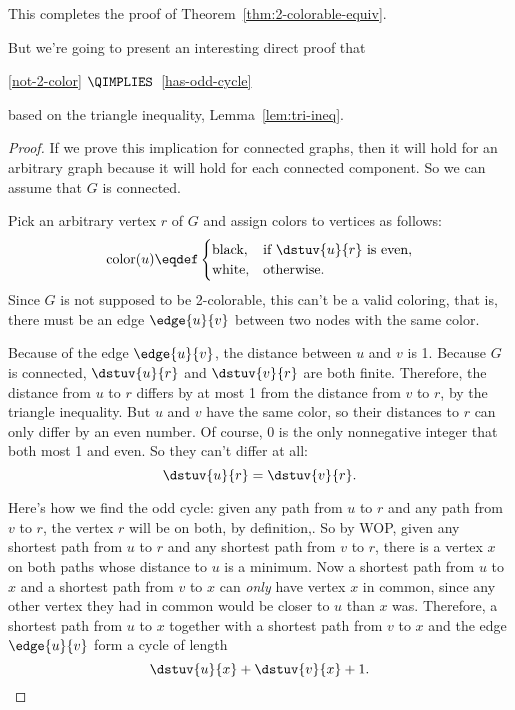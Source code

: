 This completes the proof of Theorem~\ref{thm:2-colorable-equiv}.

\begin{editingnotes}

But we're going to present an interesting direct proof that

\ref{not-2-color} $\QIMPLIES$~\ref{has-odd-cycle}

based on the triangle inequality, Lemma~\ref{lem:tri-ineq}.

\begin{proof}
  If we prove this implication for connected graphs, then it will hold
  for an arbitrary graph because it will hold for each connected
  component.  So we can assume that $G$ is connected.

  Pick an arbitrary vertex $r$ of $G$ and assign colors to vertices
  as follows:
\begin{equation}\label{colorurule}
\text{color}(u) \eqdef
             \begin{cases}
                   \text{black}, & \text{if $\dstuv{u}{r}$ is even},\\
                   \text{white}, & \text{otherwise}.
             \end{cases}
\end{equation}
Since $G$ is not supposed to be 2-colorable, this can't be a valid
coloring, that is, there must be an edge $\edge{u}{v}$ between two nodes
with the same color.

Because of the edge $\edge{u}{v}$, the distance between $u$ and $v$ is
1.  Because $G$ is connected, $\dstuv{u}{r}$ and $\dstuv{v}{r}$ are
both finite.  Therefore, the distance from $u$ to $r$ differs by at
most 1 from the distance from $v$ to $r$, by the triangle inequality.
But $u$ and $v$ have the same color, so their distances to $r$ can
only differ by an even number.  Of course, 0 is the only nonnegative
integer that both most 1 and even.  So they can't differ at all:
\begin{equation}\label{dstur=vr}
\dstuv{u}{r} = \dstuv{v}{r}.
\end{equation}

Here's how we find the odd cycle: given any path from $u$ to $r$ and
any path from $v$ to $r$, the vertex $r$ will be on both, by
definition,.  So by WOP, given any shortest path from $u$ to $r$ and
any shortest path from $v$ to $r$, there is a vertex $x$ on both paths
whose distance to $u$ is a minimum.  Now a shortest path from $u$ to
$x$ and a shortest path from $v$ to $x$ can \emph{only} have vertex
$x$ in common, since any other vertex they had in common would be
closer to $u$ than $x$ was.  Therefore, a shortest path from $u$ to
$x$ together with a shortest path from $v$ to $x$ and the edge
$\edge{u}{v}$ form a cycle of length
\begin{equation}\label{uxvx1}
\dstuv{u}{x}+  \dstuv{v}{x} +1.
\end{equation}


\end{proof}
\end{editingnotes}
